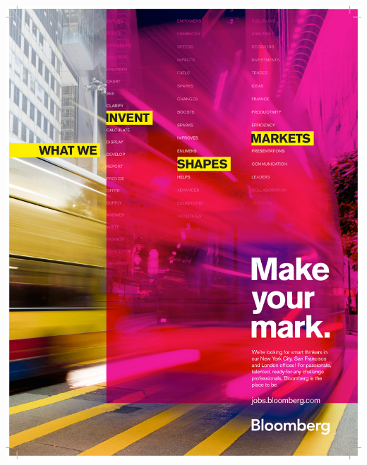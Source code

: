 \clearpage{}

{}

\begin{center}
\includegraphics[width=1\textwidth]{content/images/ads/bloomberg}
\par\end{center}

